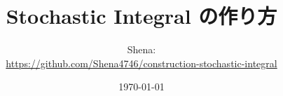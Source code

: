 \documentclass{ltjsarticle}
\begin{document}
\title{Stochastic Integral の作り方}
\author{Shena:\\ \url{https://github.com/Shena4746/construction-stochastic-integral}}
\date{\today}
\maketitle
\end{document}
